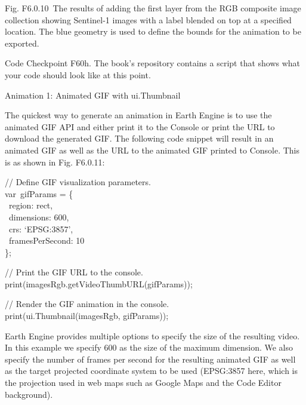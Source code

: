\documentclass[
  letterpaper,
  DIV=11,
  numbers=noendperiod]{scrreprt}
\begin{document}
Fig. F6.0.10~The results of adding the first layer from the RGB
composite image collection showing Sentinel-1 images with a label
blended on top at a specified location. The blue geometry is used to
define the bounds for the animation to be exported.

\begin{tcolorbox}[enhanced jigsaw, left=2mm, breakable, rightrule=.15mm, opacityback=0, colframe=quarto-callout-note-color-frame, colbacktitle=quarto-callout-note-color!10!white, arc=.35mm, opacitybacktitle=0.6, toptitle=1mm, colback=white, leftrule=.75mm, title=\textcolor{quarto-callout-note-color}{\faInfo}\hspace{0.5em}{Note}, toprule=.15mm, bottomtitle=1mm, titlerule=0mm, bottomrule=.15mm, coltitle=black]

Code Checkpoint F60h. The book's repository contains a script that shows
what your code should look like at this point.

\end{tcolorbox}

Animation 1: Animated GIF with ui.Thumbnail

The quickest way to generate an animation in Earth Engine is to use the
animated GIF API and either print it to the Console or print the URL to
download the generated GIF. The following code snippet will result in an
animated GIF as well as the URL to the animated GIF printed to Console.
This is as shown in Fig. F6.0.11:

// Define GIF visualization parameters.\\
var~gifParams = \{\\
\hspace*{0.333em} ~region: rect,\\
\hspace*{0.333em} ~dimensions: 600,\\
\hspace*{0.333em} ~crs: `EPSG:3857',\\
\hspace*{0.333em} ~framesPerSecond: 10\\
\};

// Print the GIF URL to the console.\\
print(imagesRgb.getVideoThumbURL(gifParams));

// Render the GIF animation in the console.\\
print(ui.Thumbnail(imagesRgb, gifParams));

Earth Engine provides multiple options to specify the size of the
resulting video. In this example we specify 600 as the size of the
maximum dimension. We also specify the number of frames per second for
the resulting animated GIF as well as the target projected coordinate
system to be used (EPSG:3857 here, which is the projection used in web
maps such as Google Maps and the Code Editor background).
\end{document}
